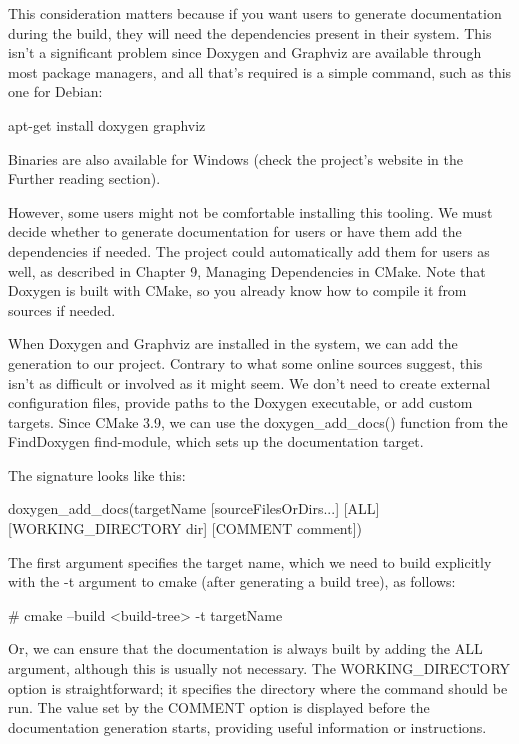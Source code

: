 This consideration matters because if you want users to generate documentation during the build, they will need the dependencies present in their system. This isn’t a significant problem since Doxygen and Graphviz are available through most package managers, and all that’s required is a simple command, such as this one for Debian:

\begin{shell}
apt-get install doxygen graphviz
\end{shell}

Binaries are also available for Windows (check the project’s website in the Further reading section).

However, some users might not be comfortable installing this tooling. We must decide whether to generate documentation for users or have them add the dependencies if needed. The project could automatically add them for users as well, as described in Chapter 9, Managing Dependencies in CMake. Note that Doxygen is built with CMake, so you already know how to compile it from sources if needed.

When Doxygen and Graphviz are installed in the system, we can add the generation to our project. Contrary to what some online sources suggest, this isn’t as difficult or involved as it might seem. We don’t need to create external configuration files, provide paths to the Doxygen executable, or add custom targets. Since CMake 3.9, we can use the doxygen\_add\_docs() function from the FindDoxygen find-module, which sets up the documentation target.

The signature looks like this:

\begin{shell}
doxygen_add_docs(targetName [sourceFilesOrDirs...]
  [ALL] [WORKING_DIRECTORY dir] [COMMENT comment])
\end{shell}

The first argument specifies the target name, which we need to build explicitly with the -t argument to cmake (after generating a build tree), as follows:

\begin{shell}
# cmake --build <build-tree> -t targetName
\end{shell}

Or, we can ensure that the documentation is always built by adding the ALL argument, although this is usually not necessary. The WORKING\_DIRECTORY option is straightforward; it specifies the directory where the command should be run. The value set by the COMMENT option is displayed before the documentation generation starts, providing useful information or instructions.

